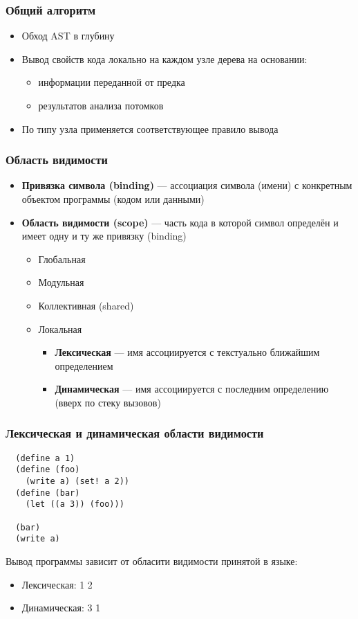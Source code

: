 \documentclass[16pt,pdf,unicode]{beamer}
\begin{document}
\begin{frame}
  \frametitle{Общий алгоритм}
\begin{itemize}
  \item Обход AST в глубину
  \item Вывод свойств кода локально на каждом узле дерева на основании:
    \begin{itemize}
      \item информации переданной от предка
      \item результатов анализа потомков
    \end{itemize}
  \item По типу узла применяется соответствующее правило вывода
\end{itemize}
\end{frame}

\begin{frame}
  \frametitle{Область видимости}
  \begin{itemize}
    \item {\bf Привязка символа (binding)} --- ассоциация символа (имени) с конкретным объектом программы (кодом или данными)
    \item {\bf Область видимости (scope)} --- часть кода в которой символ определён и имеет одну и ту же привязку (binding)
    \begin{itemize}
      \item Глобальная
      \item Модульная
      \item Коллективная (shared)
      \item Локальная
      \begin{itemize}
        \item {\bf Лексическая} --- имя ассоциируется с текстуально ближайшим определением 
        \item {\bf Динамическая} --- имя ассоциируется с последним определению (вверх по стеку вызовов)
      \end{itemize}
    \end{itemize}
  \end{itemize}
\end{frame}

\begin{frame}[fragile]
  \frametitle{Лексическая и динамическая области видимости}
\begin{lstlisting}
  (define a 1)
  (define (foo)
    (write a) (set! a 2))
  (define (bar)
    (let ((a 3)) (foo)))
    
  (bar)
  (write a)
\end{lstlisting}
Вывод программы зависит от обласити видимости принятой в языке:
\begin{itemize}
  \item Лексическая: 1 2
  \item Динамическая: 3 1
\end{itemize}
\end{frame}
\end{document}
